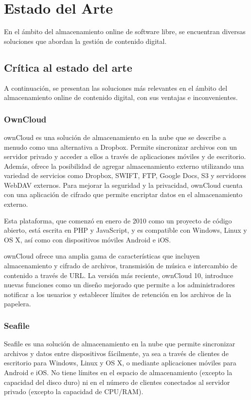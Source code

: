 \chapter{Estado del Arte}

En el ámbito del almacenamiento online de software libre, se encuentran diversas soluciones que abordan la gestión de contenido digital.

\section{Crítica al estado del arte}
A continuación, se presentan las soluciones más relevantes en el ámbito del almacenamiento online de contenido digital, con sus ventajas e inconvenientes.

\subsection{OwnCloud}

ownCloud es una solución de almacenamiento en la nube que se describe a menudo como una alternativa a Dropbox. Permite sincronizar archivos con un servidor privado y acceder a ellos a través de aplicaciones móviles y de escritorio. Además, ofrece la posibilidad de agregar almacenamiento externo utilizando una variedad de servicios como Dropbox, SWIFT, FTP, Google Docs, S3 y servidores WebDAV externos. Para mejorar la seguridad y la privacidad, ownCloud cuenta con una aplicación de cifrado que permite encriptar datos en el almacenamiento externo.

Esta plataforma, que comenzó en enero de 2010 como un proyecto de código abierto, está escrita en PHP y JavaScript, y es compatible con Windows, Linux y OS X, así como con dispositivos móviles Android e iOS.

ownCloud ofrece una amplia gama de características que incluyen almacenamiento y cifrado de archivos, transmisión de música e intercambio de contenido a través de URL. La versión más reciente, ownCloud 10, introduce nuevas funciones como un diseño mejorado que permite a los administradores notificar a los usuarios y establecer límites de retención en los archivos de la papelera.

\subsection{Seafile}

Seafile es una solución de almacenamiento en la nube que permite sincronizar archivos y datos entre dispositivos fácilmente, ya sea a través de clientes de escritorio para Windows, Linux y OS X, o mediante aplicaciones móviles para Android e iOS. No tiene límites en el espacio de almacenamiento (excepto la capacidad del disco duro) ni en el número de clientes conectados al servidor privado (excepto la capacidad de CPU/RAM).

